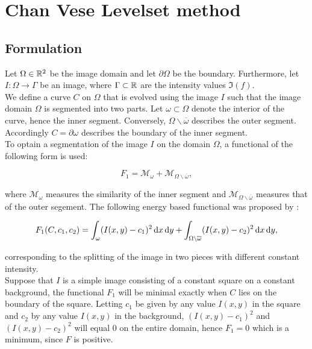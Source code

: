 
\chapter{Chan Vese Levelset method}\label{chapter:CVL}
\section{Formulation}
Let $\Omega\in \mathbb R^2$ be the image domain and let $\partial\Omega$ be the boundary. Furthermore, let $I:\Omega\to \Gamma$ be an image, where $\Gamma\subset\mathbb R$ are the intensity values $\Im(f)$.\\
We define a curve $C$ on $\Omega$ that is evolved using the image $I$ such that the image domain $\Omega$ is segmented into two parts. Let $\omega\subset\Omega$ denote the interior of the curve, hence the inner segment. Conversely, $\Omega\backslash\overline{\omega}$ describes the outer segment. Accordingly $C=\partial\omega$ describes the boundary of the inner segment.\\
To optain a segmentation of the image $I$ on the domain $\Omega$, a functional of the following form is used:

\begin{equation}
  F_1 = \mathcal{M}_{\omega} + \mathcal{M}_{\Omega\backslash\overline{\omega}},
\end{equation}

where $\mathcal{M}_{\omega}$ measures the similarity of the inner segment and $\mathcal{M}_{\Omega\backslash\overline{\omega}}$ measures that of the outer segement. The following energy based functional was proposed by \cite{chan.01}:

\begin{equation}
  F_1(C,c_1,c_2) = \int_{\omega} (I(x,y)-c_1)^2 \df x \df y + \int_{\Omega\backslash\overline{\omega}} (I(x,y)-c_2)^2 \df x \df y,\label{F0}
\end{equation} 

corresponding to the splitting of the image in two pieces with different constant intensity.\\
Suppose that $I$ is a simple image consisting of a constant square on a constant background, the functional $F_1$ will be minimal exactly when $C$ lies on the boundary of the square. Letting $c_1$ be given by any value  $I(x,y)$ in the square and $c_2$ by any value $I(x,y)$ in the background, $(I(x,y)-c_1)^2$ and $(I(x,y)-c_2)^2$ will equal 0 on the entire domain, hence $F_1=0$ which is a minimum, since $F$ is positive.\\

